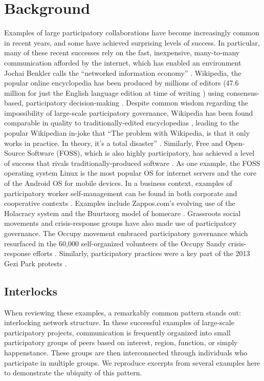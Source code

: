 \documentclass[manuscript,screen,review,acmsmall]{acmart}
\begin{document}
\section{Background}

Examples of large participatory collaborations have become increasingly common in recent years,
and some have achieved surprising levels of success.
In particular, many of these recent successes rely on the fast, inexpensive, many-to-many communication afforded by the internet,
which has enabled an environment Jochai Benkler calls the ``networked information economy''
\cite{benkler_wealth_2006}.
Wikipedia, the popular online encyclopedia has been produced by millions of editors (47.6 million for just the English language edition at time of writing \cite{noauthor_list_2024, noauthor_wikipediawikipedians_2024})
using consensus-based, participatory decision-making \cite{keegan_evolution_2017, forte_scaling_2008}.
Despite common wisdom regarding the impossibility of large-scale participatory governance,
Wikipedia has been found comparable in quality to traditionally-edited encyclopedias \cite{giles_internet_2005},
leading to the popular Wikipedian in-joke that
``The problem with Wikipedia, is that it only works in practice. In theory, it's a total disaster'' \cite{elsharbaty_editing_2016}.
Similarly, Free and Open-Source Software (FOSS),
which is also highly participatory,
has achieved a level of success that rivals traditionally-produced software
\cite{benkler_wealth_2006, raymond_cathedral_1999}.
As one example, the FOSS operating system Linux is the most popular OS for internet servers and the core of the Android OS for mobile devices.
In a business context, examples of participatory worker self-management can be found in both corporate and cooperative contexts \cite{laloux_reinventing_2014, lee_self-managing_2017}.
Examples include Zappos.com's evolving use of the Holacracy system
\cite{robertson_holacracy_2015, groth_zappos_2020}
and the Buurtzorg model of homecare
\cite{monsen_buurtzorg_2013, gray_home_2015}.
Grassroots social movements and crisis-response groups have also made use of participatory governance.
The Occupy movement embraced participatory governance \cite{detar_intertwinkles:_2013, gonzalez-bailon_networked_2016}
which resurfaced in the 60,000 self-organized volunteers of the Occupy Sandy crisis-response efforts \cite{landau_place-based_2017, brugh_combining_2019}.
Similarly, participatory practices were a key part of the 2013 Gezi Park protests
\cite{tufekci_twitter_2017}.

\subsection{Interlocks}
When reviewing these examples, a remarkably common pattern stands out: interlocking network structure.
In these successful examples of large-scale participatory projects,
communication is frequently organized into small participatory groups of peers based on interest, region, function, or simply happenstance.
These groups are then interconnected through individuals who participate in multiple groups.
We reproduce excerpts from several examples here to demonstrate the ubiquity of this pattern.
\end{document}
